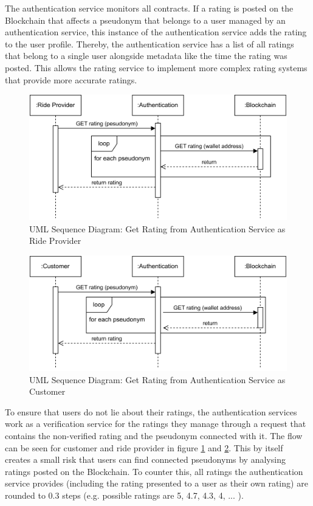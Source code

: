 The authentication service monitors all contracts. If a rating is posted on the Blockchain that affects a pseudonym that belongs to a user managed by an authentication service, this instance of the authentication service adds the rating to the user profile. Thereby, the authentication service has a list of all ratings that belong to a single user alongside metadata like the time the rating was posted. This allows the rating service to implement more complex rating systems that provide more accurate ratings.


\begin{figure}[h]
    \centering
    \includegraphics[width=\linewidth]{data/7.svg}
    \caption{UML Sequence Diagram: Get Rating from Authentication Service as Ride Provider}
    \label{fig:ratingRP}
\end{figure}

\begin{figure}[h]
    \centering
    \includegraphics[width=\linewidth]{data/9.svg}
    \caption{UML Sequence Diagram: Get Rating from Authentication Service as Customer}
    \label{fig:ratingC}
\end{figure}


To ensure that users do not lie about their ratings, the authentication services work as a verification service for the ratings they manage through a request that contains the non-verified rating and the pseudonym connected with it. The flow can be seen for customer and ride provider in figure \ref{fig:ratingRP} and \ref{fig:ratingC}. This by itself creates a small risk that users can find connected pseudonyms by analysing ratings posted on the Blockchain. To counter this, all ratings the authentication service provides (including the rating presented to a user as their own rating) are rounded to 0.3 steps (e.g. possible ratings are 5, 4.7, 4.3, 4, ... ). 



